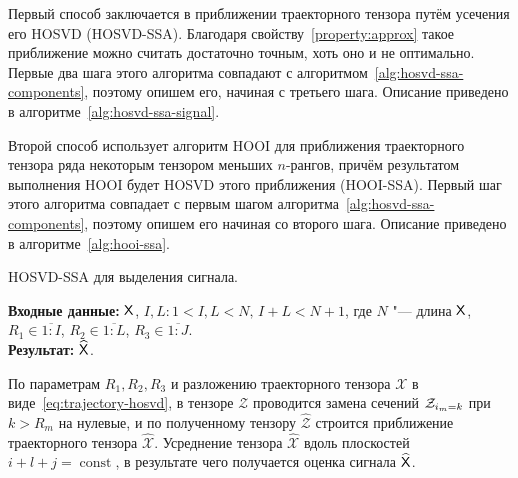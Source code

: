 \documentclass[specialist,
  substylefile=spbu.rtx,
subf,href,colorlinks=true, 12pt]{disser}
\theoremstyle{plain}
\theoremstyle{definition}
\theoremstyle{remark}
\newcommand{\Input}{\textbf{Входные данные: }}
\newcommand{\Output}{\textbf{Результат: }}
\begin{document}
Первый способ заключается в приближении траекторного тензора путём усечения его HOSVD (HOSVD-SSA).
Благодаря свойству~\ref{property:approx} такое приближение можно считать достаточно точным,
хоть оно и не оптимально.
Первые два шага этого алгоритма совпадают с алгоритмом~\ref{alg:hosvd-ssa-components}, поэтому опишем его, начиная с третьего шага.
Описание приведено в алгоритме~\ref{alg:hosvd-ssa-signal}.

Второй способ использует алгоритм HOOI для приближения траекторного тензора ряда некоторым тензором
меньших $n$-рангов, причём результатом выполнения HOOI будет HOSVD этого приближения (HOOI-SSA).
Первый шаг этого алгоритма совпадает с первым шагом алгоритма~\ref{alg:hosvd-ssa-components},
поэтому опишем его начиная со второго шага.
Описание приведено в алгоритме~\ref{alg:hooi-ssa}.

\begin{algorithm}[!ht]
  \caption{HOSVD-SSA для выделения сигнала.}
  \label{alg:hosvd-ssa-signal}
  \Input $\mathsf{X}$, $I,L: 1< I,L < N,\, I + L < N + 1$, где $N$ "--- длина $\mathsf{X}$, $R_1 \in \overline{1:I}$,
  $R_2 \in \overline{1:L}$, $R_3 \in \overline{1:J}$.\\
  \Output $\widehat{\mathsf{X}}$.

  \begin{algorithmic}[1]
    \State По параметрам $R_1, R_2, R_3$ и разложению траекторного тензора $\mathcal{X}$
    в виде~\eqref{eq:trajectory-hosvd},
    в тензоре $\mathcal{Z}$ проводится замена сечений $\mathcal{Z}_{i_m = k}$ при $k>R_m$ на нулевые,
    и по полученному тензору $\widehat{\mathcal{Z}}$
    строится приближение траекторного тензора $\widehat{\mathcal{X}}$.
    \State \label{alg:hosvd-ssa-reconstruct-step}
    Усреднение тензора $\widehat{\mathcal{X}}$ вдоль плоскостей $i+l+j=\operatorname{const}$,
    в результате чего получается оценка сигнала $\widehat{\mathsf{X}}$.
  \end{algorithmic}
\end{algorithm}
\end{document}
